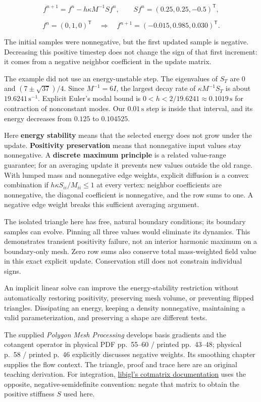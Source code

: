 \[
f^{n+1}=f^n-h\kappa M^{-1}Sf^n,\qquad
Sf^n=(0.25,0.25,-0.5)^{\mathsf T},
\]

\[
f^n=(0,1,0)^{\mathsf T}
\quad\Longrightarrow\quad
f^{n+1}=(-0.015,0.985,0.030)^{\mathsf T}.
\]

The initial samples were nonnegative, but the first updated sample is negative. Decreasing this positive timestep does not change the sign of that first increment: it comes from a negative neighbor coefficient in the update matrix.

The example did not use an energy-unstable step. The eigenvalues of \(S_T\) are \(0\) and \((7\pm\sqrt{37})/4\). Since \(M^{-1}=6I\), the largest decay rate of \(\kappa M^{-1}S_T\) is about \(19.6241\,\mathrm{s^{-1}}\). Explicit Euler's modal bound is \(0<h<2/19.6241\approx0.1019\,\mathrm s\) for contraction of nonconstant modes. Our \(0.01\,\mathrm s\) step is inside that interval, and its energy decreases from \(0.125\) to \(0.104525\).

Here \textbf{energy stability} means that the selected energy does not grow under the update. \textbf{Positivity preservation} means that nonnegative input values stay nonnegative. A \textbf{discrete maximum principle} is a related value-range guarantee; for an averaging update it prevents new values outside the old range. With lumped mass and nonnegative edge weights, explicit diffusion is a convex combination if \(h\kappa S_{ii}/M_{ii}\leq1\) at every vertex: neighbor coefficients are nonnegative, the diagonal coefficient is nonnegative, and the row sums to one. A negative edge weight breaks this sufficient averaging argument.

The isolated triangle here has free, natural boundary conditions; its boundary samples can evolve. Pinning all three values would eliminate its dynamics. This demonstrates transient positivity failure, not an interior harmonic maximum on a boundary-only mesh. Zero row sums also conserve total mass-weighted field value in this exact explicit update. Conservation still does not constrain individual signs.

An implicit linear solve can improve the energy-stability restriction without automatically restoring positivity, preserving mesh volume, or preventing flipped triangles. Dissipating an energy, keeping a density nonnegative, maintaining a valid parameterization, and preserving a shape are different tests.

The supplied \emph{Polygon Mesh Processing} develops basis gradients and the cotangent operator in physical PDF pp.~55--60 / printed pp.~43--48; physical p.~58 / printed p.~46 explicitly discusses negative weights. Its smoothing chapter supplies the flow context. The triangle, proof and trace here are an original teaching derivation. For integration, \href{https://github.com/libigl/libigl/blob/main/include/igl/cotmatrix.h}{libigl's cotmatrix documentation} uses the opposite, negative-semidefinite convention: negate that matrix to obtain the positive stiffness \(S\) used here.

